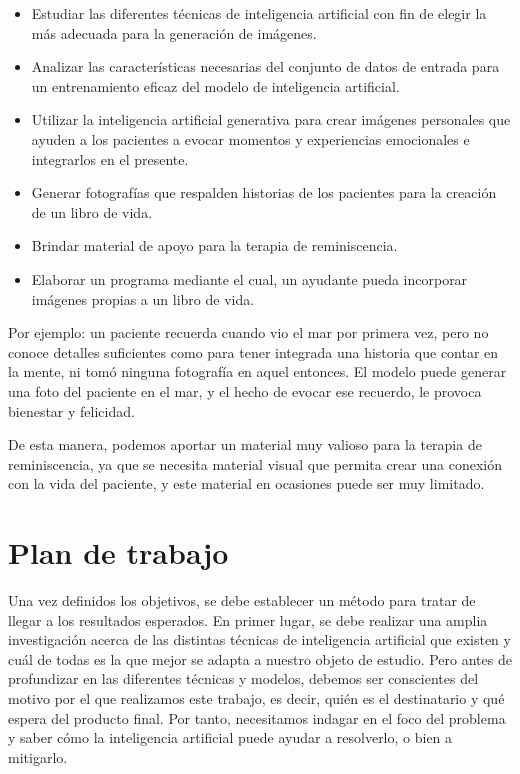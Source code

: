 \begin{itemize}
	\item Estudiar las diferentes técnicas de inteligencia artificial con fin de elegir la más adecuada para la generación de imágenes. 
	\item Analizar las características necesarias del conjunto de datos de entrada para un entrenamiento eficaz del modelo de inteligencia artificial. 
	\item Utilizar la inteligencia artificial generativa para crear imágenes personales que ayuden a los pacientes a evocar momentos y experiencias emocionales e integrarlos en el presente.
	\item Generar fotografías que respalden historias de los pacientes para la creación de un libro de vida.
	\item Brindar material de apoyo para la terapia de reminiscencia.
	\item Elaborar un programa mediante el cual, un ayudante pueda incorporar imágenes propias a un libro de vida. 
	
\end{itemize} 

Por ejemplo: un paciente recuerda cuando vio el mar por primera vez, pero no conoce detalles suficientes como para tener integrada una historia que contar en la mente, ni tomó ninguna fotografía en aquel entonces. El modelo puede generar una foto del paciente en el mar, y el hecho de evocar ese recuerdo, le provoca bienestar y felicidad.

De esta manera, podemos aportar un material muy valioso para la terapia de reminiscencia, ya que se necesita material visual que permita crear una conexión con la vida del paciente, y este material en ocasiones puede ser muy limitado.


\section{Plan de trabajo}

Una vez definidos los objetivos, se debe establecer un método para tratar de llegar a los resultados esperados. En primer lugar, se debe realizar una amplia investigación acerca de las distintas técnicas de inteligencia artificial que existen y cuál de todas es la que mejor se adapta a nuestro objeto de estudio. Pero antes de profundizar en las diferentes técnicas y modelos, debemos ser conscientes del motivo por el que realizamos este trabajo, es decir, quién es el destinatario y qué espera del producto final. Por tanto, necesitamos indagar en el foco del problema y saber cómo la inteligencia artificial puede ayudar a resolverlo, o bien a mitigarlo. 

